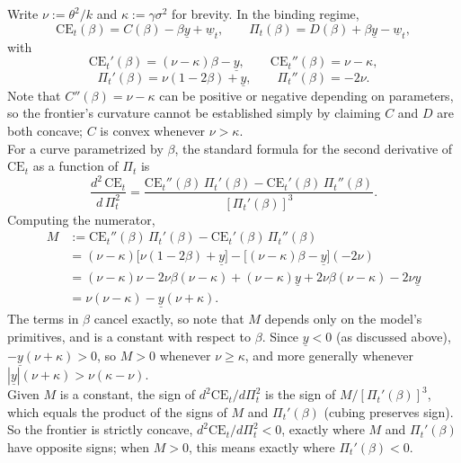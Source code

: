 \documentclass{article}
\theoremstyle{definition}
\theoremstyle{plain}
\begin{document}
Write $\nu := \theta^2/k$ and $\kappa := \gamma\sigma^2$ for brevity. In the binding regime,
\[
\text{CE}_t(\beta) = C(\beta) - \beta\underline{y} + \underline{w}_t, \qquad \Pi_t(\beta) = D(\beta) + \beta\underline{y} - \underline{w}_t,
\]
with
\[
\text{CE}_t'(\beta) = (\nu-\kappa)\beta - \underline{y}, \qquad \text{CE}_t''(\beta) = \nu - \kappa,
\]
\[
\Pi_t'(\beta) = \nu(1-2\beta) + \underline{y}, \qquad \Pi_t''(\beta) = -2\nu.
\]
Note that $C''(\beta) = \nu - \kappa$ can be positive or negative depending on parameters, so the frontier's curvature cannot be established simply by claiming $C$ and $D$ are both concave; $C$ is convex whenever $\nu > \kappa$.\\
For a curve parametrized by $\beta$, the standard formula for the second derivative of $\text{CE}_t$ as a function of $\Pi_t$ is
\[
\frac{d^2\,\text{CE}_t}{d\,\Pi_t^2} = \frac{\text{CE}_t''(\beta)\,\Pi_t'(\beta) - \text{CE}_t'(\beta)\,\Pi_t''(\beta)}{[\Pi_t'(\beta)]^3}.
\]
Computing the numerator,
\begin{align*}
M &:= \text{CE}_t''(\beta)\,\Pi_t'(\beta) - \text{CE}_t'(\beta)\,\Pi_t''(\beta) \\
&= (\nu-\kappa)\big[\nu(1-2\beta)+\underline{y}\big] - \big[(\nu-\kappa)\beta - \underline{y}\big](-2\nu) \\
&= (\nu-\kappa)\nu - 2\nu\beta(\nu-\kappa) + (\nu-\kappa)\underline{y} + 2\nu\beta(\nu-\kappa) - 2\nu\underline{y} \\
&= \nu(\nu-\kappa) - \underline{y}(\nu+\kappa).
\end{align*}
The terms in $\beta$ cancel exactly, so note that $M$ depends only on the model's primitives, and is a constant with respect to $\beta$. Since $\underline{y} < 0$ (as discussed above), $-\underline{y}(\nu+\kappa) > 0$, so $M > 0$ whenever $\nu \geq \kappa$, and more generally whenever $|\underline{y}|(\nu+\kappa) > \nu(\kappa-\nu)$.\\
Given $M$ is a constant, the sign of $d^2\text{CE}_t/d\Pi_t^2$ is the sign of $M/[\Pi_t'(\beta)]^3$, which equals the product of the signs of $M$ and $\Pi_t'(\beta)$ (cubing preserves sign). So the frontier is strictly concave, $d^2\text{CE}_t/d\Pi_t^2 < 0$, exactly where $M$ and $\Pi_t'(\beta)$ have opposite signs; when $M>0$, this means exactly where $\Pi_t'(\beta) < 0$.\\
\end{document}
